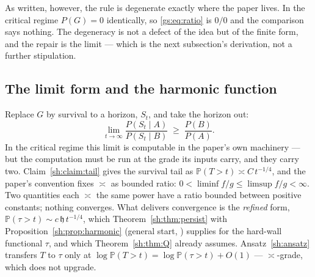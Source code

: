 \documentclass[11pt]{article}
\numberwithin{equation}{section}
\theoremstyle{plain}
\theoremstyle{definition}
\theoremstyle{remark}
\newcommand{\PP}{\mathbb{P}}
\newcommand{\hm}{\mathfrak{h}}
\begin{document}
As written, however, the rule is degenerate exactly where the paper lives. In the critical regime $P(G) = 0$ identically, so \eqref{gs:eq:ratio} is $0/0$ and the comparison says nothing. The degeneracy is not a defect of the idea but of the finite form, and the repair is the limit --- which is the next subsection's derivation, not a further stipulation.

\subsection{The limit form and the harmonic function}\label{gs:sub:limit}

Replace $G$ by survival to a horizon, $S_t$, and take the horizon out:
\begin{equation}\label{gs:eq:limit}
    \lim_{t \to \infty} \frac{P(S_t \mid A)}{P(S_t \mid B)} \;\ge\; \frac{P(B)}{P(A)}.
\end{equation}
In the critical regime this limit is computable in the paper's own machinery --- but the computation must be run at the grade its inputs carry, and they carry two. Claim~\ref{sh:claim:tail} gives the survival tail as $\PP(T > t) \asymp C\,t^{-1/4}$, and the paper's convention fixes $\asymp$ as bounded ratio: $0 < \liminf f/g \le \limsup f/g < \infty$. Two quantities each $\asymp$ the same power have a ratio bounded between positive constants; nothing converges. What delivers convergence is the \emph{refined} form, $\PP(\tau > t) \sim c\,\hm\,t^{-1/4}$, which Theorem~\ref{sh:thm:persist} with Proposition~\ref{sh:prop:harmonic} (general start, \cite{GJW99}) supplies for the hard-wall functional $\tau$, and which Theorem~\ref{sh:thm:Q} already assumes. Ansatz~\ref{sh:ansatz} transfers $T$ to $\tau$ only at $\log \PP(T>t) = \log \PP(\tau>t) + O(1)$ --- $\asymp$-grade, which does not upgrade.
\end{document}
